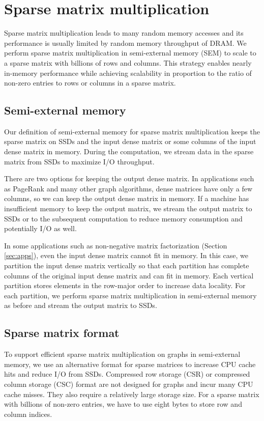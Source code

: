 \section{Sparse matrix multiplication} \label{sec:spmm}
Sparse matrix multiplication leads to many random memory
accesses and its performance is usually limited by random memory throughput
of DRAM. We perform sparse matrix multiplication in semi-external memory (SEM)
to scale to a sparse matrix with billions of rows and columns. This strategy enables
nearly in-memory performance while achieving scalability in proportion
to the ratio of non-zero entries to rows or columns in a sparse matrix.

\subsection{Semi-external memory}
Our definition of semi-external memory for sparse matrix multiplication
keeps the sparse matrix on SSDs and the input dense matrix or some columns
of the input dense matrix in memory. During the computation, we stream
data in the sparse matrix from SSDs to maximize I/O throughput.

There are two options for keeping the output dense matrix. In applications
such as PageRank and many other graph
algorithms, dense matrices have only a few columns, so we can keep the output
dense matrix in memory. If a machine has insufficient
memory to keep the output matrix, we stream the output matrix
to SSDs or to the subsequent computation to reduce memory consumption and
potentially I/O as well.

In some applications such as non-negative matrix factorization (Section
\ref{sec:apps}), even the input dense matrix cannot fit in memory. In this case,
we partition the input dense matrix vertically so that each partition has
complete columns of the original input dense matrix and can fit in memory.
Each vertical partition stores elements in the row-major order to increase
data locality. For each partition, we perform sparse matrix multiplication
in semi-external memory as before and stream the output matrix to SSDs.

\subsection{Sparse matrix format}
To support efficient sparse matrix multiplication on graphs in semi-external
memory, we use an alternative format for sparse matrices to increase
CPU cache hits and reduce I/O from SSDs. Compressed row
storage (CSR) or compressed column storage (CSC) format are not designed for
graphs and incur many CPU cache misses. They also require
a relatively large storage size. For a sparse matrix with billions of non-zero
entries, we have to use eight bytes to store row and column indices.

